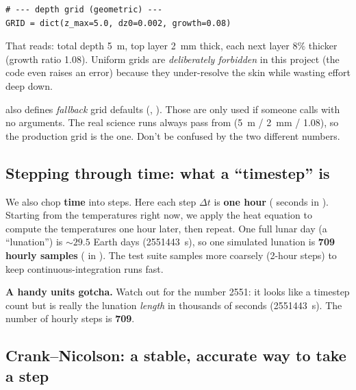 \begin{lstlisting}[caption={The production grid in \file{lunar/config.py}.}]
# --- depth grid (geometric) ---
GRID = dict(z_max=5.0, dz0=0.002, growth=0.08)
\end{lstlisting}

That reads: total depth \SI{5}{m}, top layer \SI{2}{mm} thick, each next layer
$8\%$ thicker (growth ratio 1.08). Uniform grids are \emph{deliberately
forbidden} in this project (the code even raises an error) because they
under-resolve the skin while wasting effort deep down.

\begin{headsup}
 also defines \emph{fallback} grid defaults
(, ). Those are only used
if someone calls  with no arguments. The real
science runs always pass  from  (\SI{5}{m} /
\SI{2}{mm} / 1.08), so the production grid is the  one. Don't be
confused by the two different numbers.
\end{headsup}

\subsection{Stepping through time: what a ``timestep'' is}
\label{sec:timestep}

We also chop \textbf{time} into steps. Here each step $\Delta t$ is \textbf{one
hour} ( seconds in ). Starting from the
temperatures right now, we apply the heat equation to compute the temperatures
one hour later, then repeat. One full lunar day (a ``lunation'') is
${\sim}29.5$ Earth days (\SI{2551443}{s}), so one simulated lunation is
\textbf{709 hourly samples} ( in
). The test suite samples more coarsely (2-hour steps) to keep
continuous-integration runs fast.

\begin{headsup}
\textbf{A handy units gotcha.} Watch out for the number 2551: it looks like a
timestep count but is really the lunation \emph{length} in thousands of seconds
(\SI{2551443}{s}). The number of hourly steps is \textbf{709}.
\end{headsup}

\subsection{Crank--Nicolson: a stable, accurate way to take a step}
\label{sec:cn}

